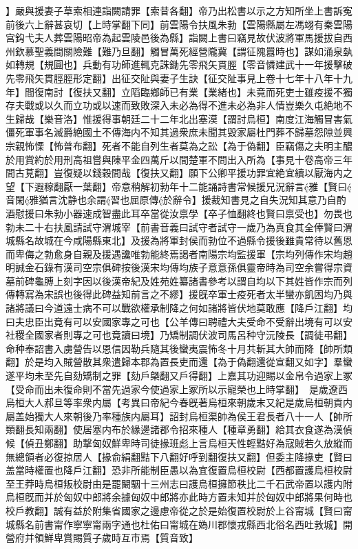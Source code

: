 】嚴與援妻子草索相連詣闕請罪【索昔各翻】帝乃出松書以示之方知所坐上書訴寃前後六上辭甚哀切【上時掌翻下同】前雲陽令扶風朱勃【雲陽縣屬左馮翊有秦雲陽宫鈎弋夫人葬雲陽昭帝為起雲陵邑後為縣】詣闕上書曰竊見故伏波將軍馬援拔自西州欽慕聖義間關險難【難乃旦翻】觸冒萬死經營隴冀【謂征隗囂時也】謀如涌泉埶如轉規【規圓也】兵動有功師進輒克誅鋤先零飛矢貫脛【零音憐建武十一年援擊破先零飛矢貫脛脛形定翻】出征交阯與妻子生訣【征交阯事見上卷十七年十八年十九年】間復南討【復扶又翻】立䧟臨鄉師已有業【業緒也】未竟而死吏士雖疫援不獨存夫戰或以久而立功或以速而致敗深入未必為得不進未必為非人情豈樂久屯絶地不生歸哉【樂音洛】惟援得事朝廷二十二年北出塞漠【謂討烏桓】南度江海觸冒害氣僵死軍事名滅爵絶國土不傳海内不知其過衆庶未聞其毁家屬杜門葬不歸墓怨隙並興宗親怖慄【怖普布翻】死者不能自列生者莫為之訟【為于偽翻】臣竊傷之夫明主醲於用賞約於用刑高祖嘗與陳平金四萬斤以間楚軍不問出入所為【事見十卷高帝三年間古莧翻】豈復疑以錢穀間哉【復扶又翻】願下公卿平援功罪宜絶宜續以厭海内之望【下遐稼翻厭一葉翻】帝意稍解初勃年十二能誦詩書常候援兄況辭言雅【賢曰音閑雅猶言沈静也余謂習也屈原傳於辭令】援裁知書見之自失況知其意乃自酌酒慰援曰朱勃小器速成智盡此耳卒當從汝禀學【卒子恤翻終也賢曰禀受也】勿畏也勃未二十右扶風請試守渭城宰【前書音義曰試守者試守一歲乃為真食其全俸賢曰渭城縣名故城在今咸陽縣東北】及援為將軍封侯而勃位不過縣令援後雖貴常待以舊恩而卑侮之勃愈身自親及援遇讒唯勃能終焉謁者南陽宗均監援軍【宗均列傳作宋均趙明誠金石錄有漢司空宗俱碑按後漢宋均傳均族子意意孫俱靈帝時為司空余嘗得宗資墓前碑龜膊上刻字因以後漢帝紀及姓苑姓纂諸書參考以謂自均以下其姓皆作宗而列傳轉寫為宋誤也後得此碑益知前言之不繆】援旣卒軍士疫死者太半蠻亦飢困均乃與諸將議曰今道遠士病不可以戰欲權承制降之何如諸將皆伏地莫敢應【降戶江翻】均曰夫忠臣出竟有可以安國家專之可也【公羊傳曰聘禮大夫受命不受辭出境有可以安社稷全國家者則專之可也竟讀曰境】乃矯制調伏波司馬呂种守沅陵長【調徒弔翻】命种奉詔書入虜營告以恩信因勒兵隨其後蠻夷震怖冬十月共斬其大帥而降【帥所類翻】於是均入賊營散其衆遣歸本郡為置長吏而還【為于偽翻還從宣翻又如字】羣蠻遂平均未至先自劾矯制之罪【劾戶槩翻又戶得翻】上嘉其功迎賜以金帛令過家上冢【受命而出未復命則不當先過家今使過家上冢所以示寵榮也上時掌翻】　是歲遼西烏桓大人郝旦等率衆内屬【考異曰帝紀今春旣著烏桓來朝歲末又紀是歲烏桓朝貢内屬盖始獨大人來朝後乃率種族内屬耳】詔封烏桓渠帥為侯王君長者八十一人【帥所類翻長知兩翻】使居塞内布於緣邊諸郡令招來種人【種章勇翻】給其衣食遂為漢偵候【偵丑鄭翻】助撃匈奴鮮卑時司徒掾班彪上言烏桓天性輕黠好為寇賊若久放縱而無總領者必復掠居人【掾俞絹翻黠下八翻好呼到翻復扶又翻】但委主降掾吏【賢曰盖當時權置也降戶江翻】恐非所能制臣愚以為宜復置烏桓校尉【西都置護烏桓校尉至王莽時烏桓叛校尉由是罷闞駰十三州志曰護烏桓擁節秩比二千石武帝置以護内附烏桓旣而并於匈奴中郎將余據匈奴中郎將亦此時方置未知并於匈奴中郎將果何時也校戶教翻】誠有益於附集省國家之邊慮帝從之於是始復置校尉於上谷甯城【賢曰甯城縣名前書甯作寧寧甯兩字通也杜佑曰甯城在媯川郡懷戎縣西北俗名西吐㪍城】開營府并領鮮卑賞賜質子歲時互市焉【質音致】


